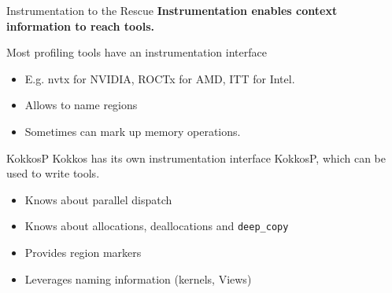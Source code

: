 \begin{frame}[fragile]{Instrumentation to the Rescue}
  \textbf{Instrumentation enables context information to reach tools.}

  \vspace{5pt}
  Most profiling tools have an instrumentation interface

  \begin{itemize}
    \item E.g. nvtx for NVIDIA, ROCTx for AMD, ITT for Intel.
    \item Allows to name regions
    \item Sometimes can mark up memory operations.
  \end{itemize}

  \pause
  \vspace{5pt}
  \begin{block}{KokkosP}
    Kokkos has its own instrumentation interface KokkosP, which can be used to write tools.
  \end{block}

  \begin{itemize}
    \item Knows about parallel dispatch
    \item Knows about allocations, deallocations and \texttt{deep\_copy}
    \item Provides region markers
    \item Leverages naming information (kernels, Views)
  \end{itemize}

\end{frame}


